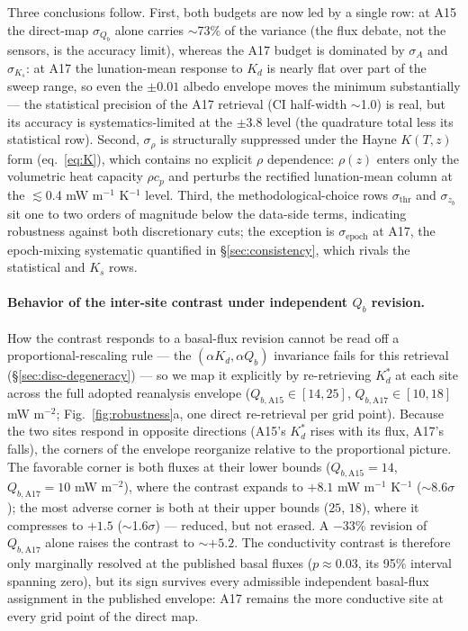 \documentclass[11pt]{article}
\begin{document}
Three conclusions follow. First, both budgets are now led by a single
row: at A15 the direct-map $\sigma_{Q_b}$ alone carries $\sim$73\% of
the variance (the flux debate, not the sensors, is the accuracy limit),
whereas the A17 budget is dominated by
$\sigma_A$ and $\sigma_{K_s}$: at A17 the lunation-mean response to $K_d$ is
nearly flat over part of the sweep range, so even the $\pm0.01$ albedo
envelope moves the minimum substantially --- the statistical precision of
the A17 retrieval (CI half-width $\sim$1.0) is real, but its accuracy is
systematics-limited at the $\pm$3.8 level (the quadrature total less its
statistical row). Second, $\sigma_\rho$ is
structurally suppressed under the Hayne $K(T,z)$ form (eq.~\ref{eq:K}),
which contains no explicit $\rho$ dependence: $\rho(z)$ enters only the
volumetric heat capacity $\rho c_p$ and perturbs the rectified lunation-mean
column at the $\lesssim$0.4 mW m$^{-1}$ K$^{-1}$ level. Third, the
methodological-choice rows $\sigma_\mathrm{thr}$ and $\sigma_{z_b}$ sit
one to two orders of magnitude below the data-side terms, indicating
robustness against both discretionary cuts; the exception is
$\sigma_\mathrm{epoch}$ at A17, the epoch-mixing systematic quantified in
\S\ref{sec:consistency}, which rivals the statistical and $K_s$ rows.

\paragraph*{Behavior of the inter-site contrast under independent $Q_b$ revision.}
How the contrast responds to a basal-flux revision cannot be read off a
proportional-rescaling rule --- the $(\alpha K_d,\alpha Q_b)$ invariance
fails for this retrieval (\S\ref{sec:disc-degeneracy}) --- so we map it
explicitly by re-retrieving $K_d^{*}$ at each site across the full
adopted reanalysis envelope ($Q_{b,\mathrm{A15}}\in[14,25]$,
$Q_{b,\mathrm{A17}}\in[10,18]$ mW m$^{-2}$; Fig.~\ref{fig:robustness}a,
one direct re-retrieval per grid point).
Because the two sites respond in opposite directions
(A15's $K_d^{*}$ rises with its flux, A17's falls), the corners of the
envelope reorganize relative to the proportional picture. The
favorable corner is both fluxes at their lower bounds
($Q_{b,\mathrm{A15}}=14$, $Q_{b,\mathrm{A17}}=10$ mW m$^{-2}$), where
the contrast expands to $+8.1$ mW m$^{-1}$ K$^{-1}$
($\sim$8.6$\sigma$); the most adverse corner is both at their upper
bounds ($25$, $18$), where it compresses to $+1.5$
($\sim$1.6$\sigma$) --- reduced, but not erased. A $-33\%$ revision of
$Q_{b,\mathrm{A17}}$ alone raises the contrast to $\sim$$+5.2$.
The conductivity contrast is therefore only marginally resolved at the
published basal fluxes ($p\approx 0.03$, its 95\% interval spanning
zero), but its sign survives every admissible independent
basal-flux assignment in the published envelope: A17 remains the more
conductive site at every grid point of the direct map.
\end{document}
